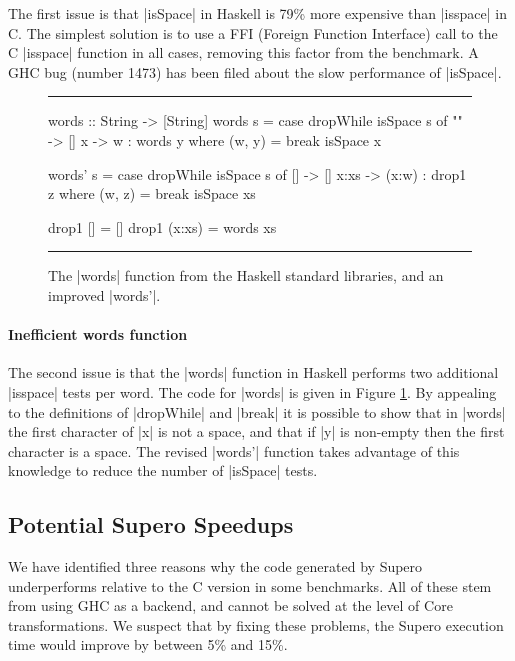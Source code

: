 \documentclass{llncs}
\newenvironment{fig}
    {\begin{figure}[tbp]\hrule}
    {\end{figure}}
\newcommand{\figend}{\hrule}
\newcommand{\perc}{\%
    }
\begin{document}
The first issue is that |isSpace| in Haskell is 79\perc more expensive than |isspace| in C. The simplest solution is to use a FFI (Foreign Function Interface) \cite{haskell_ffi} call to the C |isspace| function in all cases, removing this factor from the benchmark. A GHC bug (number 1473) has been filed about the slow performance of |isSpace|.

\begin{fig}
\begin{code}
words :: String -> [String]
words s = case  dropWhile isSpace s of
                ""  ->  []
                x   ->  w : words y
                        where (w, y) = break isSpace x

words' s = case  dropWhile isSpace s of
                 []    ->  []
                 x:xs  ->  (x:w) : drop1 z
                           where (w, z) = break isSpace xs

drop1 []      = []
drop1 (x:xs)  = words xs
\end{code}
\figend
\caption{The |words| function from the Haskell standard libraries, and an improved |words'|.}
\label{fig:words}
\end{fig}

\paragraph{Inefficient \textsf{words} function}

The second issue is that the |words| function in Haskell performs two additional |isspace| tests per word. The code for |words| is given in Figure \ref{fig:words}. By appealing to the definitions of |dropWhile| and |break| it is possible to show that in |words| the first character of |x| is not a space, and that if |y| is non-empty then the first character is a space. The revised |words'| function takes advantage of this knowledge to reduce the number of |isSpace| tests.

\subsection{Potential Supero Speedups}

We have identified three reasons why the code generated by Supero underperforms relative to the C version in some benchmarks. All of these stem from using GHC as a backend, and cannot be solved at the level of Core transformations. We suspect that by fixing these problems, the Supero execution time would improve by between 5\% and 15\%.
\end{document}
